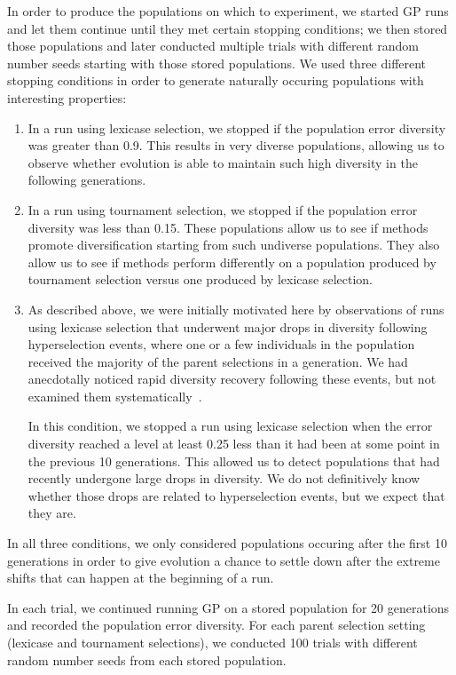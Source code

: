 \documentclass{sig-alternate-05-2015}
\begin{document}
In order to produce the populations on which to experiment, we started GP runs and let them continue until they met certain stopping conditions; we then stored those populations and later conducted multiple trials with different random number seeds starting with those stored populations. We used three different stopping conditions in order to generate naturally occuring populations with interesting properties:
\begin{enumerate}
\item
In a run using lexicase selection, we stopped if the population error diversity was greater than 0.9. This results in very diverse populations, allowing us to observe whether evolution is able to maintain such high diversity in the following generations.

\item
In a run using tournament selection, we stopped if the population error diversity was less than 0.15. These populations allow us to see if methods promote diversification starting from such undiverse populations. They also allow us to see if methods perform differently on a population produced by tournament selection versus one produced by lexicase selection.

\item
As described above, we were initially motivated here by observations of runs using lexicase selection that underwent major drops in diversity following hyperselection events, where one or a few individuals in the population received the majority of the parent selections in a generation. We had anecdotally noticed rapid diversity recovery following these events, but not examined them systematically~\cite{Helmuth:2016:GECCO}.

In this condition, we stopped a run using lexicase selection when the error diversity reached a level at least 0.25 less than it had been at some point in the previous 10 generations. This allowed us to detect populations that had recently undergone large drops in diversity. We do not definitively know whether those drops are related to hyperselection events, but we expect that they are.

\end{enumerate}
In all three conditions, we only considered populations occuring after the first 10 generations in order to give evolution a chance to settle down after the extreme shifts that can happen at the beginning of a run.

In each trial, we continued running GP on a stored population for 20 generations and recorded the population error diversity. For each parent selection setting (lexicase and tournament selections), we conducted 100 trials with different random number seeds from each stored population.
\end{document}
